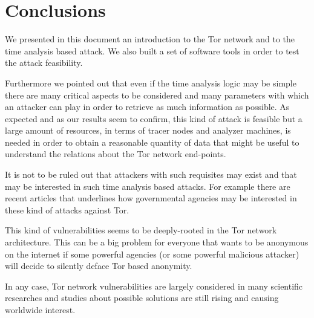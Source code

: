 \section{Conclusions}
We presented in this document an introduction to the Tor network and to
the time analysis based attack. We also built a set of software tools in order
to test the attack feasibility. 

Furthermore we pointed out that even if the time analysis logic may be simple there are many critical
aspects to be considered and many parameters with which an attacker can
play in order to retrieve as much information as possible. As expected
and as our
results seem to confirm, this kind of attack is feasible but a large
amount of resources, in terms of tracer nodes and analyzer machines, 
is needed in order to obtain a reasonable quantity of data that might be useful to
understand the relations about the Tor network end-points. 

It is not to
be ruled out that attackers with such requisites may exist and that may be
interested in such time analysis based attacks. For example there are recent
articles\cite{vantor}\cite{schneier2013attacking} that underlines how
governmental agencies may be interested in
these kind of attacks against Tor.  

This kind of vulnerabilities seems to be deeply-rooted in the Tor network architecture.
This can be a big problem for everyone that wants to be anonymous on the internet if
some powerful agencies (or some powerful malicious attacker) will decide to
silently deface Tor based anonymity.

In any case, Tor network vulnerabilities are largely considered in many
scientific researches and studies about possible solutions are still
rising and causing worldwide interest.

